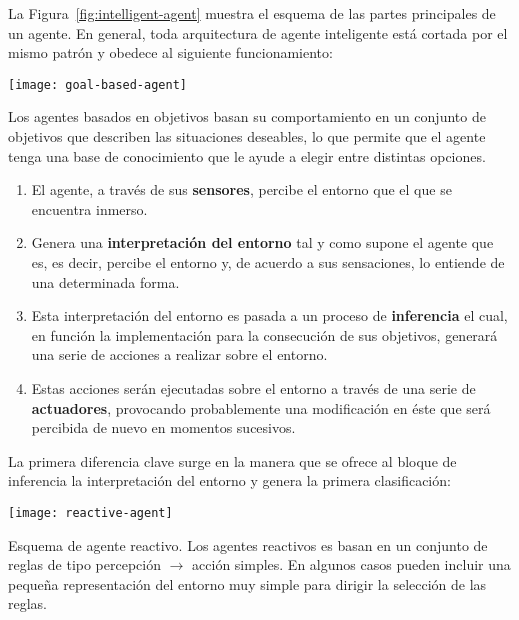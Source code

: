 La Figura~\ref{fig:intelligent-agent} muestra el esquema de las partes principales de un agente. En general, toda arquitectura de agente inteligente está cortada por el mismo patrón y obedece al siguiente funcionamiento:

\begin{marginfigure}
	\texttt{[image: goal-based-agent]}
	\caption[Esquema de agente basado en objetivos]{Los agentes basados en objetivos basan su comportamiento en un conjunto de objetivos que describen las situaciones deseables, lo que permite que el agente tenga una base de conocimiento que le ayude a elegir entre distintas opciones.}
	\label{fig:goal-based-agent}
\end{marginfigure}

\begin{enumerate}
	\item El agente, a través de sus \textbf{sensores}, percibe el entorno que el que se encuentra inmerso.
	\item Genera una \textbf{interpretación del entorno} tal y como supone el agente que es, es decir, percibe el entorno y, de acuerdo a sus sensaciones, lo entiende de una determinada forma.
	\item Esta interpretación del entorno es pasada a un proceso de \textbf{inferencia} el cual, en función la implementación para la consecución de sus objetivos, generará una serie de acciones a realizar sobre el entorno.
	\item Estas acciones serán ejecutadas sobre el entorno a través de una serie de \textbf{actuadores}, provocando probablemente una modificación en éste que será percibida de nuevo en momentos sucesivos.
\end{enumerate}

La primera diferencia clave surge en la manera que se ofrece al bloque de inferencia la interpretación del entorno y genera la primera clasificación:

\begin{marginfigure}
	\texttt{[image: reactive-agent]}
	\caption[Esquema de agente reactivo]{Esquema de agente reactivo. Los agentes reactivos es basan en un conjunto de reglas de tipo percepción $\rightarrow$ acción simples. En algunos casos pueden incluir una pequeña representación del entorno muy simple para dirigir la selección de las reglas.}
	\label{fig:reactive-agent}
\end{marginfigure}

